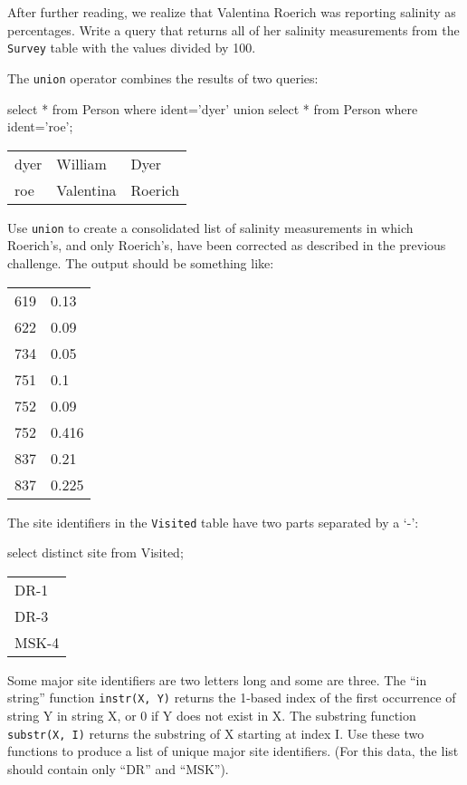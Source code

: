 \documentclass{book}
\begin{document}
\begin{challenge}
  After further reading, we realize that Valentina Roerich was reporting
  salinity as percentages. Write a query that returns all of her
  salinity measurements from the \texttt{Survey} table with the values
  divided by 100.
\end{challenge}

\begin{challenge}
  The \texttt{union} operator combines the results of two queries:
\begin{VerbIn}
select * from Person where ident='dyer' union select * from Person where ident='roe';
\end{VerbIn}

\begin{tabular}{lll}
dyer & William & Dyer \\
roe & Valentina & Roerich \\
\end{tabular}

Use \texttt{union} to create a consolidated list of salinity
measurements in which Roerich's, and only Roerich's, have been corrected
as described in the previous challenge. The output should be something
like:

\begin{tabular}{ll}
619 & 0.13 \\
622 & 0.09 \\
734 & 0.05 \\
751 & 0.1 \\
752 & 0.09 \\
752 & 0.416 \\
837 & 0.21 \\
837 & 0.225 \\
\end{tabular}
\end{challenge}

\begin{challenge}
  The site identifiers in the \texttt{Visited} table have two parts
  separated by a `-':

\begin{VerbIn}
select distinct site from Visited;
\end{VerbIn}

\begin{tabular}{l}
DR-1 \\
DR-3 \\
MSK-4 \\
\end{tabular}

Some major site identifiers are two letters long and some are three. The
``in string'' function \texttt{instr(X, Y)} returns the 1-based index of
the first occurrence of string Y in string X, or 0 if Y does not exist
in X. The substring function \texttt{substr(X, I)} returns the substring
of X starting at index I. Use these two functions to produce a list of
unique major site identifiers. (For this data, the list should contain
only ``DR'' and ``MSK'').
\end{challenge}
\end{document}
